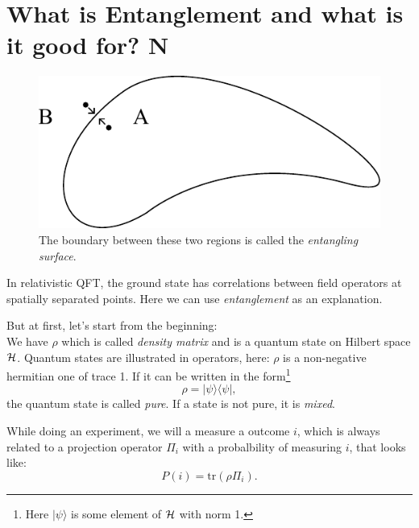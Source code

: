 \section{What is Entanglement and what is it good for? \textbf{N}}
	 \begin{figure}[tbp]
	 	\begin{center}
	 		\includegraphics[scale=1]{entangledcorr}
	 		\caption{The boundary between these two regions is called the \textit{entangling surface}.}
	 	\end{center}
	 \end{figure}
	In relativistic QFT, the ground state has correlations between field operators at spatially separated points. Here we can use \textit{entanglement} as an explanation.
	
	But at first, let's start from the beginning:
	\\
	We have $\rho$ which is called \textit{density matrix} and is a quantum state on Hilbert space $\mathcal{H}$. Quantum states are illustrated in operators, here: $\rho$ is a non-negative hermitian one of trace 1. If it can be written in the form\footnote{Here $|\psi\rangle$ is some element of $\mathcal{H}$ with norm 1.}
		\begin{equation}
			\rho=|\psi\rangle \langle\psi|,
		\end{equation}
	 the quantum state is called \textit{pure}. If a state is not pure, it is \textit{mixed}.
	 
	 While doing an experiment, we will a measure a outcome $i$, which is always related to a projection operator $\Pi_i$ with a probalbility of measuring $i$, that looks like: 
		 \begin{equation}
	 		P(i)=\mathrm{tr}(\rho\Pi_i).
	 	\end{equation}
	 
